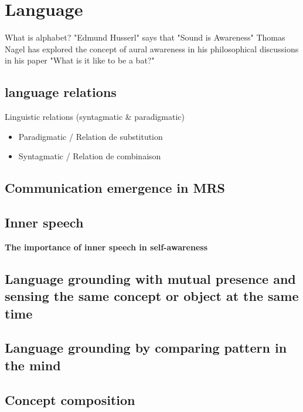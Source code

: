 \chapter{Language}

What is alphabet? "Edmund Husserl" says that "Sound is Awareness" Thomas Nagel has explored the concept of aural awareness in his philosophical discussions in his paper "What is it like to be a bat?"

    \section{language relations}
        Linguistic relations (syntagmatic & paradigmatic)
        \begin{itemize}
            \item Paradigmatic / Relation de substitution
            \item Syntagmatic / Relation de combinaison
        \end{itemize}

    \section{Communication emergence in MRS}

    \section{Inner speech}
        \textbf{The importance of inner speech in self-awareness} 

    \section{Language grounding with mutual presence and sensing the same concept or object at the same time}

    \section{Language grounding by comparing pattern in the mind}

    \section{Concept composition}

